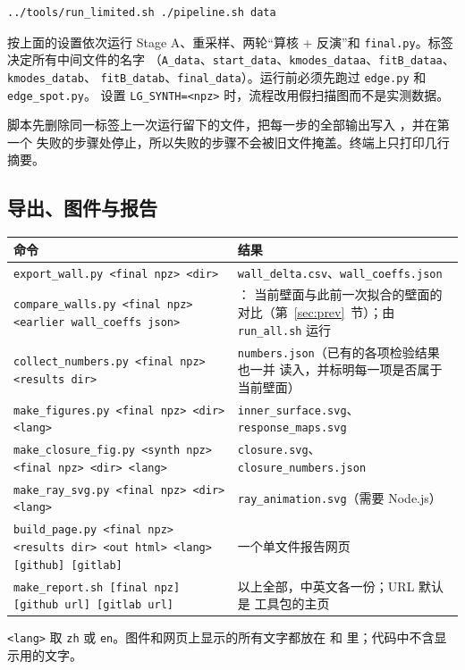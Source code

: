 \documentclass[11pt,a4paper,fontset=fandol]{ctexart}
\newcommand{\code}[1]{\texttt{#1}}
\begin{document}
\begin{lstlisting}
../tools/run_limited.sh ./pipeline.sh data
\end{lstlisting}
按上面的设置依次运行 Stage A、重采样、两轮“算核 + 反演”和 \code{final.py}。标签决定所有中间文件的名字
（\code{A\_data}、\code{start\_data}、\code{kmodes\_dataa}、\code{fitB\_dataa}、\code{kmodes\_datab}、
\code{fitB\_datab}、\code{final\_data}）。运行前必须先跑过 \code{edge.py} 和 \code{edge\_spot.py}。
设置 \code{LG\_SYNTH=<npz>} 时，流程改用假扫描图而不是实测数据。

脚本先删除同一标签上一次运行留下的文件，把每一步的全部输出写入 ，并在第一个
失败的步骤处停止，所以失败的步骤不会被旧文件掩盖。终端上只打印几行摘要。

\subsection{导出、图件与报告}

\begin{tabularx}{\textwidth}{@{}L{6.6cm}Y@{}}
\toprule
命令 & 结果 \\
\midrule
\code{export\_wall.py <final npz> <dir>} & \code{wall\_delta.csv}、\code{wall\_coeffs.json} \\
\code{compare\_walls.py <final npz> <earlier wall\_coeffs json>} & ：
当前壁面与此前一次拟合的壁面的对比（第~\ref{sec:prev}~节）；由 \code{run\_all.sh} 运行 \\
\code{collect\_numbers.py <final npz> <results dir>} & \code{numbers.json}（已有的各项检验结果也一并
读入，并标明每一项是否属于当前壁面） \\
\code{make\_figures.py <final npz> <dir> <lang>} & \code{inner\_surface.svg}、\code{response\_maps.svg} \\
\code{make\_closure\_fig.py <synth npz> <final npz> <dir> <lang>} & \code{closure.svg}、
\code{closure\_numbers.json} \\
\code{make\_ray\_svg.py <final npz> <dir> <lang>} & \code{ray\_animation.svg}（需要 Node.js） \\
\code{build\_page.py <final npz> <results dir> <out html> <lang> [github] [gitlab]} & 一个单文件报告网页 \\
\code{make\_report.sh [final npz] [github url] [gitlab url]} & 以上全部，中英文各一份；URL 默认是
工具包的主页 \\
\bottomrule
\end{tabularx}

\code{<lang>} 取 \code{zh} 或 \code{en}。图件和网页上显示的所有文字都放在  和
 里；代码中不含显示用的文字。
\end{document}
